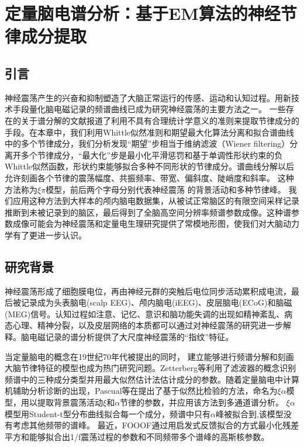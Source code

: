 \chapter{定量脑电谱分析：基于EM算法的神经节律成分提取}

\section{引言}
神经震荡产生的兴奋和抑制塑造了大脑正常运行的传感、运动和认知过程。用新技术手段量化脑电磁记录的频谱曲线已成为研究神经震荡的主要方法之一。 一些存在的关于谱分解的文献报道了利用不具有合理统计学意义的准则来提取节律成分的手段。在本章中，我们利用Whittle似然准则和期望最大化算法分离和拟合谱曲线中的多个节律成分，我们分析发现“期望”步相当于维纳滤波（Wiener filtering）分离开多个节律成分，“最大化”步是最小化平滑惩罚和基于单调性形状约束的负Whittle似然函数，形状约束能够拟合多种不同形状的节律成分。谱曲线分解以后允许刻画各个节律的震荡幅度、共振频率、带宽、偏斜度、陡峭度和斜率。 这种方法称为$\xi\pi$模型，前后两个字母分别代表神经震荡
的背景活动和多种节律峰。 我们应用这种方法到大样本的颅内脑电数据集，从被试正常脑区的有限空间采样记录推断到未被记录到的脑区，最后得到了全脑高空间分辨率频谱参数成像。这种谱参数成像可能会为神经震荡和定量电生理研究提供了常模地形图，使我们对大脑动力学有了更进一步认识。

\section{研究背景}
神经震荡形成了细胞膜电位，再由神经元群的突触后电位同步活动累积成电流，最后被记录成为头表脑电(scalp EEG)、颅内脑电(iEEG)、皮层脑电(ECoG)和脑磁(MEG)信号。认知过程如注意、记忆、意识和脑功能失调的出现如精神紊乱、病态心理、精神分裂，以及皮层网络的本质都可以通过对神经震荡的研究进一步解释。脑电磁记录的谱分析提供了大尺度神经震荡的“指纹”特征。

当定量脑电的概念在19世纪70年代被提出的同时，
建立能够进行频谱分解和刻画大脑节律特征的模型也成为热门研究问题。Zetterberg等利用了滤波器的概念识别频谱中的三种成分类型并用最大似然估计法估计成分的参数。随着定量脑电中计算机辅助分析诊断的出现，Pascual等在\cite{pascual1988parametric}提出了基于似然比检验的方法，命名为$\xi\alpha$模型，用以提取背景震荡活动$\xi$和$\alpha$节律的参数，并应用该方法到多通道谱分析。 $\xi\alpha$模型用Student-t型分布曲线拟合每一个成分，频谱中只有$\alpha$峰被拟合到,该模型没有考虑其他频带的谱峰。 最近，FOOOF通过用启发式反馈拟合的方式最小化残差平方和能够拟合出1/f震荡过程的参数和不同频带多个谱峰的高斯核参数。

